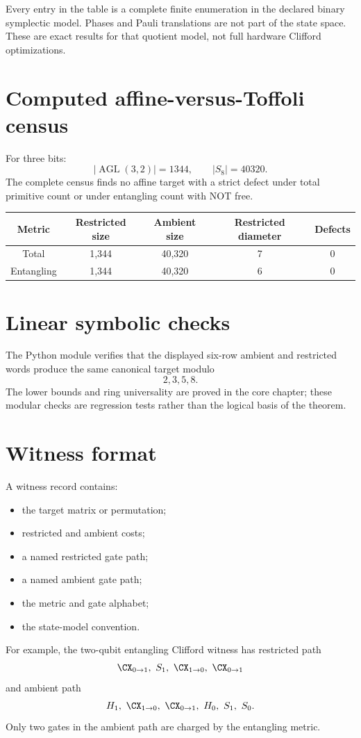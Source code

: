 \begin{computedbox}
Every entry in the table is a complete finite enumeration in the declared binary symplectic model.  Phases and Pauli translations are not part of the state space.  These are exact results for that quotient model, not full hardware Clifford optimizations.
\end{computedbox}

\section{Computed affine-versus-Toffoli census}
For three bits:
\[
|\operatorname{AGL}(3,2)|=1344,
\qquad
|S_8|=40320.
\]
The complete census finds no affine target with a strict defect under total primitive count or under entangling count with NOT free.

\begin{longtable}{@{}ccccc@{}}
\toprule
Metric & Restricted size & Ambient size & Restricted diameter & Defects\\
\midrule
Total & 1,344 & 40,320 & 7 & 0\\
Entangling & 1,344 & 40,320 & 6 & 0\\
\bottomrule
\end{longtable}

\section{Linear symbolic checks}
The Python module verifies that the displayed six-row ambient and restricted words produce the same canonical target modulo
\[
2,3,5,8.
\]
The lower bounds and ring universality are proved in the core chapter; these modular checks are regression tests rather than the logical basis of the theorem.

\section{Witness format}
A witness record contains:
\begin{itemize}
\item the target matrix or permutation;
\item restricted and ambient costs;
\item a named restricted gate path;
\item a named ambient gate path;
\item the metric and gate alphabet;
\item the state-model convention.
\end{itemize}
For example, the two-qubit entangling Clifford witness has restricted path
\[
\CX_{0\to1},\ S_1,\ \CX_{1\to0},\ \CX_{0\to1}
\]
and ambient path
\[
H_1,\ \CX_{1\to0},\ \CX_{0\to1},\ H_0,\ S_1,\ S_0.
\]
Only two gates in the ambient path are charged by the entangling metric.


